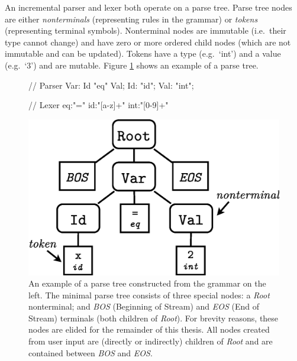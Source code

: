 \documentclass[sigplan,screen]{acmart}\settopmatter{printfolios=true,printccs=false,printacmref=false}
\begin{document}
An incremental parser and lexer both operate on a parse tree. Parse tree nodes
are either \emph{nonterminals} (representing rules in the grammar) or
\emph{tokens} (representing terminal symbols). Nonterminal nodes are immutable
(i.e.~their type cannot change) and have zero or more ordered child nodes
(which are not immutable and can be updated). Tokens have a type (e.g.~`int')
and a value (e.g.~`3') and are mutable. Figure \ref{fig_example_parsetree}
shows an example of a parse tree.

\begin{figure}
\begin{minipage}[b]{0.17\textwidth}
\begin{lsteco}
// Parser
Var: Id "eq" Val;
Id: "id";
Val: "int";

// Lexer
eq:"="
id:"[a-z]+"
int:"[0-9]+"
\end{lsteco}
\end{minipage}
\begin{minipage}[b]{0.30\textwidth}
\includegraphics[width=1.0\textwidth]{images/sampleparsetree}
\end{minipage}
\caption{An example of a parse tree constructed from the grammar on the left.
The minimal parse tree consists of three
special nodes: a \emph{Root} nonterminal; and \emph{BOS} (Beginning of
Stream) and \emph{EOS} (End of Stream) terminals (both children of
\emph{Root}). For brevity reasons, these nodes are elided for the remainder of
this thesis. All nodes created from user input are (directly or indirectly)
children of \emph{Root} and are contained between \emph{BOS} and \emph{EOS}.}
\label{fig_example_parsetree}
\end{figure}
\end{document}
